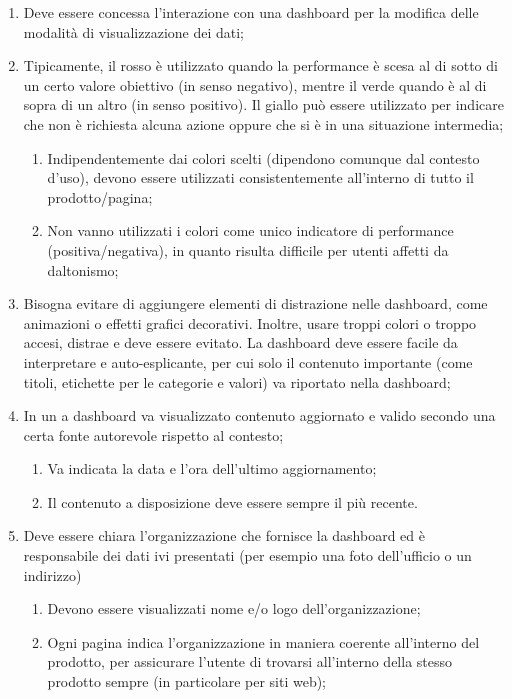 \begin{enumerate}
    \item Deve essere concessa l'interazione con una dashboard per la modifica delle modalità di visualizzazione dei dati;\label{lg:16}
    \item Tipicamente, il rosso è utilizzato quando la performance è scesa al di sotto di un certo valore obiettivo (in senso negativo), mentre il verde quando è al di sopra di un altro (in senso positivo). Il giallo può essere utilizzato per indicare che non è richiesta alcuna azione oppure che si è in una situazione intermedia;\label{lg:17}
    \begin{enumerate}[label=\alph*.]
        \item Indipendentemente dai colori scelti (dipendono comunque dal contesto d'uso), devono essere utilizzati consistentemente all'interno di tutto il prodotto/pagina;\label{lg:17.a}
        \item Non vanno utilizzati i colori come unico indicatore di performance (positiva/negativa), in quanto risulta difficile per utenti affetti da daltonismo;\label{lg:17.b}
    \end{enumerate}
    \item Bisogna evitare di aggiungere elementi di distrazione nelle dashboard, come animazioni o effetti grafici decorativi. Inoltre, usare troppi colori o troppo accesi, distrae e deve essere evitato. La dashboard deve essere facile da interpretare e auto-esplicante, per cui solo il contenuto importante (come titoli, etichette per le categorie e valori) va riportato nella dashboard;\label{lg:18}
    \item In un a dashboard va visualizzato contenuto aggiornato e valido secondo una certa fonte autorevole rispetto al contesto;\label{lg:19}
    \begin{enumerate}[label=\alph*.]
        \item Va indicata la data e l'ora dell'ultimo aggiornamento; \label{lg:19.a}
        \item Il contenuto a disposizione deve essere sempre il più recente. \label{lg:19.b}
    \end{enumerate}
    \item Deve essere chiara l'organizzazione che fornisce la dashboard ed è responsabile dei dati ivi presentati (per esempio una foto dell'ufficio o un indirizzo)\label{lg:20}
    \begin{enumerate}[label=\alph*.]
        \item Devono essere visualizzati nome e/o logo dell'organizzazione; \label{lg:20.a}
        \item Ogni pagina indica l'organizzazione in maniera coerente all'interno del prodotto, per assicurare l'utente di trovarsi all'interno della stesso prodotto sempre (in particolare per siti web);\label{lg:20.b}

\end{enumerate}
\end{enumerate}
